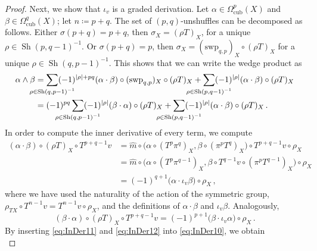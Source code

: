 \documentclass[12pt,reqno, a4paper]{amsart}
\numberwithin{equation}{section}
\theoremstyle{plain}
\theoremstyle{definition}
\theoremstyle{remark}
\DeclareMathOperator{\Shuff}{Sh}
\newcommand{\Rmult}{\hat{m}}
\newcommand{\Swp}{\mathrm{swp}}
\begin{document}
\begin{proof}
Next, we show that $\iota_v$ is a graded derivation. Let $\alpha \in \Omega^p_\mathrm{cub}(X)$ and $\beta \in \Omega^q_\mathrm{cub}(X)$; let $n \coloneqq p+q$. The set of $(p,q)$-unshuffles can be decomposed as follows. Either $\sigma(p+q) = p+q$, then $\sigma_X =  (\rho T)_X$, for a unique $\rho \in \Shuff(p,q-1)^{-1}$. Or $\sigma(p+q) = p$, then $\sigma_X =  (\Swp_{q,p})_X \circ (\rho T)_X$ for a unique $\rho \in \Shuff(q,p-1)^{-1}$. This shows that we can write the wedge product as
\begin{equation}
\label{eq:InDer10}
\begin{split}
  \alpha \wedge \beta
  &=
  \sum_{\mathclap{\rho \in \Shuff(q,p-1)^{-1}}}
  (-1)^{|\rho|+pq} (\alpha \cdot \beta) \circ (\Swp_{q,p})_X \circ (\rho T)_X
  +
  \sum_{\mathclap{\rho \in \Shuff(p,q-1)^{-1}}}
  (-1)^{|\rho|} (\alpha \cdot \beta) \circ  (\rho T)_X
  \\
  &=
  (-1)^{pq}
  \sum_{\mathclap{\rho \in \Shuff(q,p-1)^{-1}}}
  (-1)^{|\rho|} (\beta \cdot \alpha) \circ (\rho T)_X
  +
  \sum_{\mathclap{\rho \in \Shuff(p,q-1)^{-1}}}
  (-1)^{|\rho|} (\alpha \cdot \beta) \circ  (\rho T)_X
  \,.
\end{split}
\end{equation}
In order to compute the inner derivative of every term, we compute
\begin{equation}
\label{eq:InDer11}
\begin{split}
  (\alpha \cdot \beta) \circ (\rho T)_X \circ T^{p+q-1}v
  &=
  \Rmult\circ\bigl(\alpha\circ (T^p\pi^q)_X,\beta\circ(\pi^pT^q)_X\bigr)
  \circ T^{p+q-1}v \circ \rho_X
  \\
  &=
  \Rmult\circ\bigl(
    \alpha \circ (T^p \pi^{q-1})_X,
    \beta \circ T^{q-1}v \circ (\pi^p T^{q-1})_X \bigr) \circ \rho_X
  \\
  &=
  (-1)^{q+1} \bigl(\alpha \cdot \iota_v \beta\bigr) \circ \rho_X
  \,,
\end{split}
\end{equation}
where we have used the naturality of the action of the symmetric group, $\rho_{TX} \circ T^{n-1} v = T^{n-1} v \circ \rho_X$, and the definitions of $\alpha \cdot \beta$ and $\iota_v \beta$. Analogously,
\begin{equation}
\label{eq:InDer12}
  (\beta \cdot \alpha) \circ (\rho T)_X \circ T^{p+q-1}v
  =
  (-1)^{p+1} \bigl(\beta \cdot \iota_v \alpha\bigr) \circ \rho_X
  \,.
\end{equation}
By inserting \eqref{eq:InDer11} and \eqref{eq:InDer12} into \eqref{eq:InDer10}, we obtain
\begin{equation*}

\end{equation*}
\end{proof}
\end{document}
